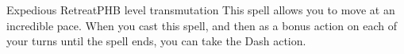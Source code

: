 \begin{spell}{Expedious Retreat}{PHB}{ level transmutation}
{
}
This spell allows you to move at an incredible pace.
When you cast this spell, and then as a bonus action
on each of your turns until the spell ends, you can take
the Dash action.
\end{spell}